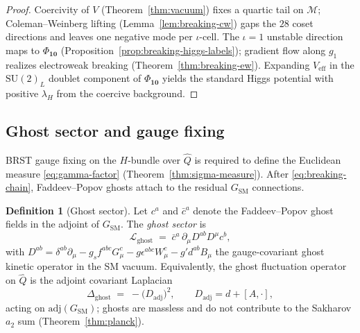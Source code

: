 \documentclass[aps,prd,onecolumn,amsmath,amssymb,nofootinbib,11pt]{revtex4-2}
\numberwithin{equation}{section}
\theoremstyle{plain}
\theoremstyle{definition}
\newtheorem{definition}[theorem]{Definition}
\theoremstyle{remark}
\begin{document}
\begin{proof}
Coercivity of $V$ (Theorem~\ref{thm:vacuum}) fixes a quartic tail on
$\mathcal{M}$; Coleman--Weinberg lifting (Lemma~\ref{lem:breaking-cw}) gaps
the $28$ coset directions and leaves one negative mode per $\iota$-cell. The
$\iota=1$ unstable direction maps to $\Phi_{\mathbf{10}}$
(Proposition~\ref{prop:breaking-higgs-labels}); gradient flow along $g_1$
realizes electroweak breaking (Theorem~\ref{thm:breaking-ew}). Expanding
$V_{\mathrm{eff}}$ in the $\mathrm{SU}(2)_L$ doublet component of
$\Phi_{\mathbf{10}}$ yields the standard Higgs potential with positive
$\lambda_H$ from the coercive background.
\end{proof}

\subsection{Ghost sector and gauge fixing}
\label{sec:sm-lagrangian:ghost}

BRST gauge fixing on the $H$-bundle over $\hat Q$ is required to define the
Euclidean measure \eqref{eq:gamma-factor} (Theorem~\ref{thm:sigma-measure}).
After \eqref{eq:breaking-chain}, Faddeev--Popov ghosts attach to the residual
$G_{\mathrm{SM}}$ connections.

\begin{definition}[Ghost sector]\label{def:sm-ghost}
Let $c^a$ and $\bar c^a$ denote the Faddeev--Popov ghost fields in the adjoint
of $G_{\mathrm{SM}}$. The \emph{ghost sector} is
\begin{equation}\label{eq:sm-ghost}
  \mathcal{L}_{\mathrm{ghost}}
  \;=\;
  \bar c^a\,\partial_\mu D^{ab} D^\mu c^b,
\end{equation}
with $D^{ab}=\delta^{ab}\partial_\mu-g_sf^{abc}G_\mu^c-g\epsilon^{abc}W_\mu^c
-g'd^{ab}B_\mu$ the gauge-covariant ghost kinetic operator in the SM vacuum.
Equivalently, the ghost fluctuation operator on $\hat Q$ is the adjoint
covariant Laplacian
\begin{equation}\label{eq:sm-ghost-operator}
  \Delta_{\mathrm{ghost}}
  \;=\;
  -\bigl(D_{\mathrm{adj}}\bigr)^2,
  \qquad
  D_{\mathrm{adj}}=d+[A,\cdot],
\end{equation}
acting on $\mathrm{adj}(G_{\mathrm{SM}})$; ghosts are massless and do not
contribute to the Sakharov $a_2$ sum (Theorem~\ref{thm:planck}).
\end{definition}
\end{document}
